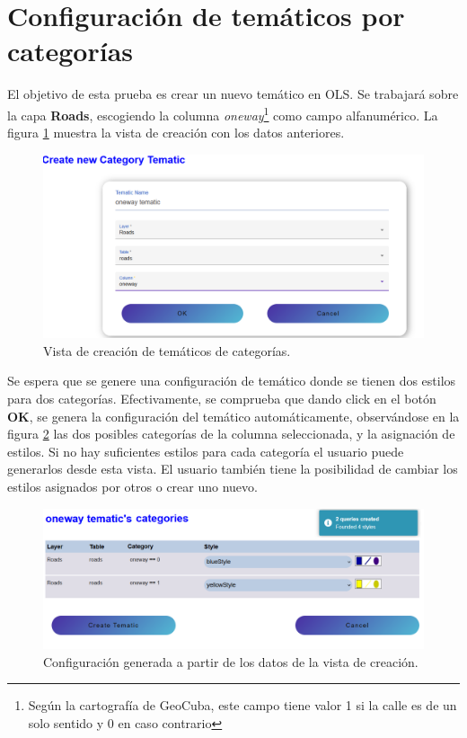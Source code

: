 \section{Configuraci\'on de tem\'aticos por categor\'ias}
El objetivo de esta prueba es crear un nuevo tem\'atico en OLS. Se trabajar\'a sobre la capa \textbf{Roads}, escogiendo la columna \textit{oneway}\footnote{Seg\'un la cartograf\'ia de GeoCuba, este campo tiene valor 1 si la calle es de un solo sentido y 0 en caso contrario} como campo alfanum\'erico. La figura \ref{create} muestra la vista de creaci\'on con los datos anteriores.

\begin{figure}[h]
\centering
\label{create}
\includegraphics[scale=0.5]{images/createTematic.png} 
\caption{Vista de creaci\'on de tem\'aticos de categor\'ias.}
\end{figure}

Se espera que se genere una configuraci\'on de tem\'atico donde se tienen dos estilos para dos categor\'ias. Efectivamente, se comprueba que dando click en el bot\'on \textbf{OK}, se genera la configuraci\'on del tem\'atico autom\'aticamente, observ\'andose en la figura \ref{config} las dos posibles categor\'ias de la columna seleccionada, y la asignaci\'on de estilos. Si no hay suficientes estilos para cada categor\'ia el usuario puede generarlos desde esta vista. El usuario tambi\'en tiene la posibilidad de cambiar los estilos asignados por otros o crear uno nuevo.

\begin{figure}[h]
\centering
\label{config}
\includegraphics[scale=0.4]{images/configTematic.png}
\caption{Configuraci\'on generada a partir de los datos de la vista de creaci\'on.}
\end{figure}

